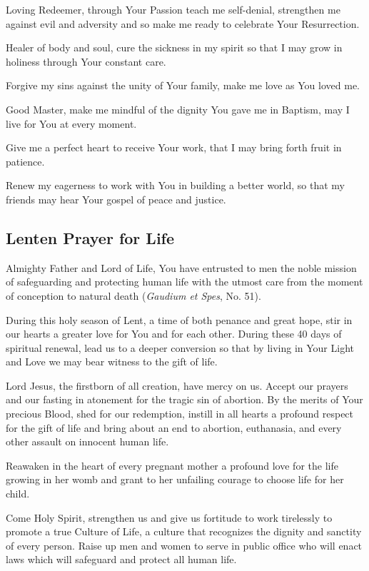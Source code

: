\documentclass[12pt]{article}
\newcommand{\prayertitle}[1]{\subsection{#1}}
\begin{document}
Loving Redeemer, through Your Passion teach me self-denial, strengthen me against evil and adversity and so make me ready to celebrate Your Resurrection.

Healer of body and soul, cure the sickness in my spirit so that I may grow in holiness through Your constant care.

Forgive my sins against the unity of Your family, make me love as You loved me.

Good Master, make me mindful of the dignity You gave me in Baptism, may I live for You at every moment.

Give me a perfect heart to receive Your work, that I may bring forth fruit in patience.

Renew my eagerness to work with You in building a better world, so that my friends may hear Your gospel of peace and justice.

\prayertitle{Lenten Prayer for Life}
Almighty Father and Lord of Life,
You have entrusted to men the noble mission of safeguarding and protecting human life with the utmost care from the moment of conception to natural death (\textit{Gaudium et Spes}, No. 51).

During this holy season of Lent, a time of both penance and great hope, stir in our hearts a greater love for You and for each other.
During these 40 days of spiritual renewal, lead us to a deeper conversion so that by living in Your Light and Love we may bear witness to the gift of life.

Lord Jesus, the firstborn of all creation, have mercy on us. 
Accept our prayers and our fasting in atonement for the tragic sin of abortion. 
By the merits of Your precious Blood, shed for our redemption, instill in all hearts a profound respect for the gift of life and bring about an end to abortion, euthanasia, and every other assault on innocent human life.

Reawaken in the heart of every pregnant mother a profound love for the life growing in her womb and grant to her unfailing courage to choose life for her child.

Come Holy Spirit, strengthen us and give us fortitude to work tirelessly to promote a true Culture of Life, a culture that recognizes the dignity and sanctity of every person.
Raise up men and women to serve in public office who will enact laws which will safeguard and protect all human life.
\end{document}
